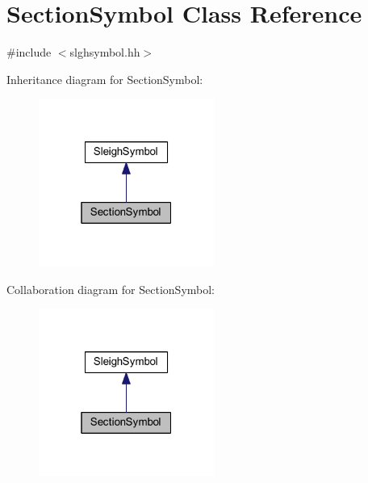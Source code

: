 \hypertarget{class_section_symbol}{}\section{Section\+Symbol Class Reference}
\label{class_section_symbol}


{\ttfamily \#include $<$slghsymbol.\+hh$>$}



Inheritance diagram for Section\+Symbol\+:
\nopagebreak
\begin{figure}[H]
\begin{center}
\leavevmode
\includegraphics[width=163pt]{class_section_symbol__inherit__graph}
\end{center}
\end{figure}


Collaboration diagram for Section\+Symbol\+:
\nopagebreak
\begin{figure}[H]
\begin{center}
\leavevmode
\includegraphics[width=163pt]{class_section_symbol__coll__graph}
\end{center}
\end{figure}
